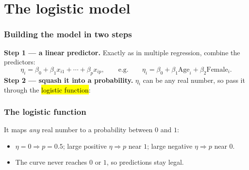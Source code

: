 \documentclass[slidestop,compress,mathserif]{beamer}
\begin{document}
\section{The logistic model}
\begin{frame}
\frametitle{Building the model in two steps}

\textbf{Step 1 --- a linear predictor.} Exactly as in multiple regression, combine the predictors:
$$
\eta_i=\beta_0+\beta_1x_{i1}+\cdots+\beta_px_{ip},
\qquad\text{e.g.}\qquad
\eta_i=\beta_0+\beta_1\text{Age}_i+\beta_2\text{Female}_i.
$$
\vspace{0.2em}
\textbf{Step 2 --- squash it into a probability.} $\eta_i$ can be any real number, so pass it through the \hl{logistic function}:


\end{frame}
\begin{frame}
\frametitle{The logistic function}

It maps \emph{any} real number to a probability between $0$ and $1$:

\begin{center}
\end{center}

\vspace{-0.3em}
\begin{itemize}
\item $\eta=0 \Rightarrow p=0.5$; large positive $\eta \Rightarrow p$ near $1$; large negative $\eta \Rightarrow p$ near $0$.
\item The curve never reaches $0$ or $1$, so predictions stay legal.
\end{itemize}

\end{frame}
\end{document}
